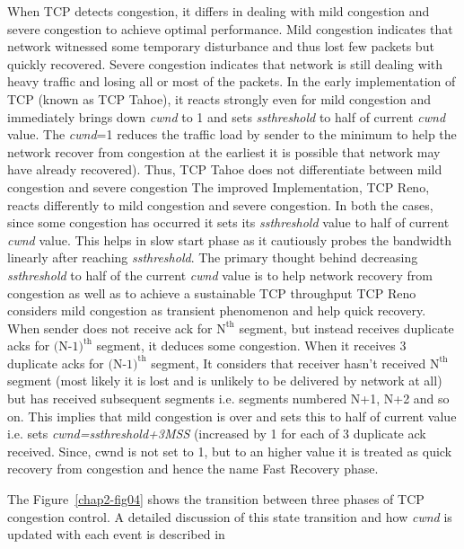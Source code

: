 \begin{multicols}{2}
When TCP detects congestion, it differs in dealing with mild congestion and severe congestion to achieve optimal performance.  Mild congestion indicates that network witnessed some temporary disturbance and thus lost few packets but quickly recovered. Severe congestion indicates that network is still dealing with heavy traffic and losing all or most of the packets. In the early implementation of TCP (known as TCP Tahoe), it reacts strongly even for mild congestion and immediately brings down \textit{cwnd} to 1 and sets \textit{ssthreshold} to half of current \textit{cwnd} value. The \textit{cwnd}=1 reduces the traffic load by sender to the minimum to help the network recover from congestion at the earliest it is possible that network may have already recovered). Thus, TCP Tahoe does not differentiate between mild congestion and severe congestion The improved Implementation, TCP Reno, reacts differently to mild congestion and severe congestion. In both the cases, since some congestion has occurred it sets its \textit{ssthreshold} value to half of current \textit{cwnd} value. This helps in slow start phase as it cautiously probes the bandwidth linearly after reaching \textit{ssthreshold}. The primary thought behind decreasing \textit{ssthreshold} to half of the current \textit{cwnd} value is to help network recovery from congestion as well as to achieve a sustainable TCP throughput TCP Reno considers mild congestion as transient phenomenon and help quick recovery. When sender does not receive ack for $\text{N}^{\text{th}}$ segment, but  instead receives duplicate acks for $\text{(N-1)}^{\text{th}}$ segment, it deduces some congestion. When it receives 3 duplicate acks for $\text{(N-1)}^{\text{th}}$  segment, It considers that receiver hasn’t received $\text{N}^{\text{th}}$ segment (most likely it is lost and is unlikely to be delivered by network at all) but has received subsequent segments i.e. segments numbered N+1, N+2 and so on. This implies that mild congestion is over and sets this to half of current value i.e. sets \textit{cwnd=ssthreshold+3MSS} (increased by 1 for each of 3 duplicate ack received. Since, cwnd is not set to 1, but to an higher value it is treated as quick recovery from congestion and hence the name Fast Recovery phase.

The Figure~\ref{chap2-fig04} shows the transition between three phases of TCP congestion control. A detailed discussion of this state transition and how \textit{cwnd} is updated with each event is described in \cite{art2-key03}


\end{multicols}
